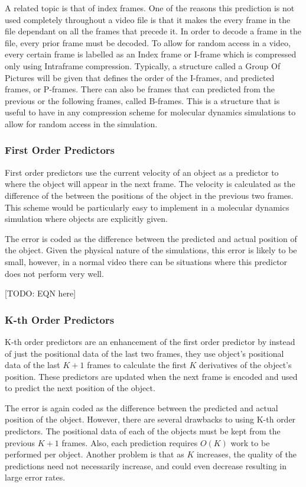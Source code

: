 \documentclass[a4paper,11pt]{report}
\begin{document}
A related topic is that of index frames. One of the reasons this prediction is not used completely throughout a video file is that it makes the every frame in the file dependant on all the frames that precede it. In order to decode a frame in the file, every prior frame must be decoded. To allow for random access in a video, every certain frame is labelled as an Index frame or I-frame which is compressed only using Intraframe compression. Typically, a structure called a Group Of Pictures will be given that defines the order of the I-frames, and predicted frames, or P-frames\cite{vandalore2001sal}. There can also be frames that can predicted from the previous or the following frames, called B-frames. This is a structure that is useful to have in any compression scheme for molecular dynamics simulations to allow for random access in the simulation.

\subsubsection*{First Order Predictors}

First order predictors use the current velocity of an object as a predictor to where the object will appear in the next frame. The velocity is calculated as the difference of the between the positions of the object in the previous two frames. This scheme would be particularly easy to implement in a molecular dynamics simulation where objects are explicitly given.

The error is coded as the difference between the predicted and actual position of the object. Given the physical nature of the simulations, this error is likely to be small, however, in a normal video there can be situations where this predictor does not perform very well.

[TODO: EQN here]
\subsubsection*{K-th Order Predictors}

K-th order predictors are an enhancement of the first order predictor by instead of just the positional data of the last two frames, they use object's positional data of the last $K+1$ frames to calculate the first $K$ derivatives of the object's position. These predictors are updated when the next frame is encoded and used to predict the next position of the object.

The error is again coded as the difference between the predicted and actual position of the object. However, there are several drawbacks to using K-th order predictors. The positional data of each of the objects must be kept from the previous $K+1$ frames. Also, each prediction requires $O(K)$ work to be performed per object. Another problem is that as $K$ increases, the quality of the predictions need not necessarily increase, and could even decrease resulting in large error rates.
\end{document}
